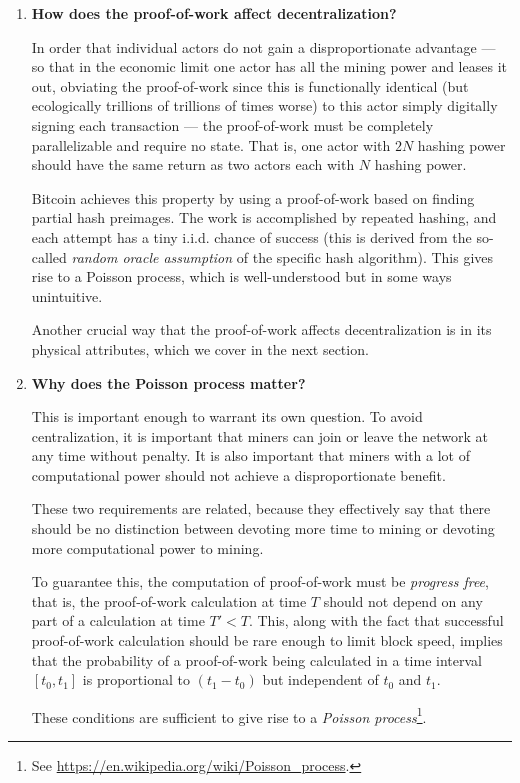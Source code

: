 \documentclass[letterpaper]{article}
\theoremstyle{xxx}
\theoremstyle{evil}
\theoremstyle{yyy}
\theoremstyle{plain}
\theoremstyle{zzz}
\begin{document}
\begin{enumerate}
\item \textbf{How does the proof-of-work affect decentralization?}

In order that individual actors do not gain a disproportionate advantage ---
so that in the economic limit one actor has all the mining power and
leases it out, obviating the proof-of-work since this is functionally
identical (but ecologically trillions of trillions of times worse) to
this actor simply digitally signing each transaction --- the proof-of-work
must be completely parallelizable and require no state. That is, one actor
with $2N$ hashing power should have the same return as two actors each with
$N$ hashing power.

Bitcoin achieves this property by using a proof-of-work based on finding
partial hash preimages. The work is accomplished by repeated hashing, and
each attempt has a tiny i.i.d. chance of success (this is derived from the
so-called \emph{random oracle assumption} of the specific hash algorithm).
This gives rise to a Poisson process, which is well-understood but in some
ways unintuitive.

Another crucial way that the proof-of-work affects decentralization is
in its physical attributes, which we cover in the next section.

\item \textbf{Why does the Poisson process matter?}

This is important enough to warrant its own question. To avoid centralization,
it is important that miners can join or leave the network at any time without
penalty. It is also important that miners with a lot of computational power
should not achieve a disproportionate benefit.

These two requirements are related, because they effectively say that there
should be no distinction between devoting more time to mining or devoting
more computational power to mining.

To guarantee this, the computation of proof-of-work must be \emph{progress free},
that is, the proof-of-work calculation at time $T$ should not depend on any part
of a calculation at time $T' < T$. This, along with the fact that successful
proof-of-work calculation should be rare enough to limit block speed, implies
that the probability of a proof-of-work being calculated in a time interval
$[t_0, t_1]$ is proportional to $(t_1 - t_0)$ but independent of $t_0$ and $t_1$.

These conditions are sufficient to give rise to a \emph{Poisson process}\footnote{See
\url{https://en.wikipedia.org/wiki/Poisson_process}.}.


\end{enumerate}
\end{document}

